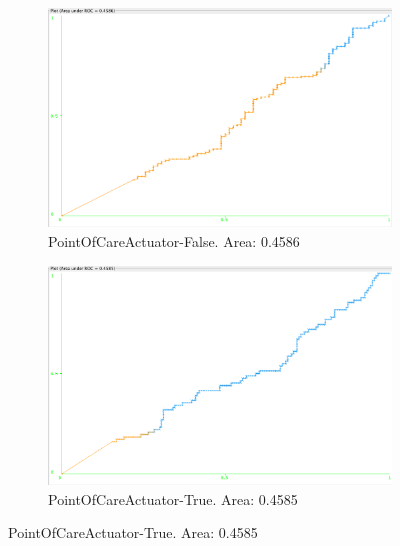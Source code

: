 \documentclass[11pt, notitlepage,abstracton,oneside]{article}   	%
\begin{document}
\begin{figure}[H]
    \ContinuedFloat
    \begin{subfigure}[b]{0.45\textwidth}
        \centering
        \includegraphics[width=\textwidth]{figures/approach2/PointOfCareActuator-False(0)}
        \caption{PointOfCareActuator-False. Area: 0.4586}
        \label{fig:PointOfCareActuator-False(0)}
    \end{subfigure}
    \hfill
    \begin{subfigure}[b]{0.45\textwidth}
        \centering
        \includegraphics[width=\textwidth]{figures/approach2/PointOfCareActuator-True(1)}
        \caption{PointOfCareActuator-True. Area: 0.4585}
        \label{fig:PointOfCareActuator-True(1)}
    \end{subfigure}
    \hfill


\end{figure}
\end{document}
